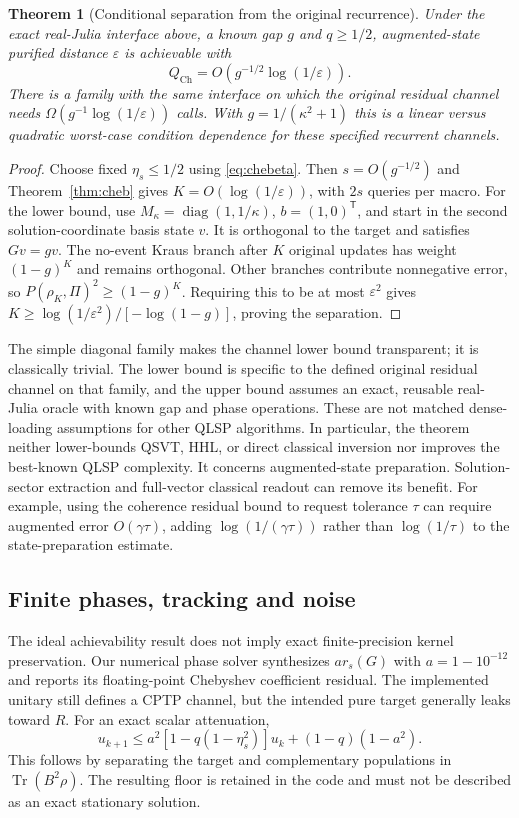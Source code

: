 \documentclass{ieeeaccess}
\newtheorem{theorem}{Theorem}\newtheorem{lemma}{Lemma}
\newcommand{\eps}{\varepsilon}\newcommand{\tr}{\mathsf T}
\newcommand{\Tr}{\operatorname{Tr}}\newcommand{\E}{\mathcal E}
\begin{document}
\begin{theorem}[Conditional separation from the original recurrence]\label{thm:separation}
Under the exact real-Julia interface above, a known gap $g$ and $q\ge1/2$, augmented-state purified distance $\eps$ is achievable with
\begin{equation}\label{eq:queryupper}
Q_{\mathrm{Ch}}=O(g^{-1/2}\log(1/\eps)).
\end{equation}
There is a family with the same interface on which the original residual channel needs $\Omega(g^{-1}\log(1/\eps))$ calls. With $g=1/(\kappa^2+1)$ this is a linear versus quadratic worst-case condition dependence for these specified recurrent channels.
\end{theorem}
\begin{proof}
Choose fixed $\eta_s\le1/2$ using \eqref{eq:chebeta}. Then $s=O(g^{-1/2})$ and Theorem~\ref{thm:cheb} gives $K=O(\log(1/\eps))$, with $2s$ queries per macro. For the lower bound, use $M_\kappa=\operatorname{diag}(1,1/\kappa)$, $b=(1,0)^{\tr}$, and start in the second solution-coordinate basis state $v$. It is orthogonal to the target and satisfies $Gv=gv$. The no-event Kraus branch after $K$ original updates has weight $(1-g)^K$ and remains orthogonal. Other branches contribute nonnegative error, so $P(\rho_K,\Pi)^2\ge(1-g)^K$. Requiring this to be at most $\eps^2$ gives $K\ge\log(1/\eps^2)/[-\log(1-g)]$, proving the separation.
\end{proof}
The simple diagonal family makes the channel lower bound transparent; it is classically trivial. The lower bound is specific to the defined original residual channel on that family, and the upper bound assumes an exact, reusable real-Julia oracle with known gap and phase operations. These are not matched dense-loading assumptions for other QLSP algorithms. In particular, the theorem neither lower-bounds QSVT, HHL, or direct classical inversion nor improves the best-known QLSP complexity. It concerns augmented-state preparation. Solution-sector extraction and full-vector classical readout can remove its benefit. For example, using the coherence residual bound to request tolerance $\tau$ can require augmented error $O(\gamma\tau)$, adding $\log(1/(\gamma\tau))$ rather than $\log(1/\tau)$ to the state-preparation estimate.

\subsection{Finite phases, tracking and noise}
The ideal achievability result does not imply exact finite-precision kernel preservation. Our numerical phase solver synthesizes $a r_s(G)$ with $a=1-10^{-12}$ and reports its floating-point Chebyshev coefficient residual. The implemented unitary still defines a CPTP channel, but the intended pure target generally leaks toward $R$. For an exact scalar attenuation,
\begin{equation}\label{eq:attenuation}
u_{k+1}\le a^2[1-q(1-\eta_s^2)]u_k+(1-q)(1-a^2).
\end{equation}
This follows by separating the target and complementary populations in $\Tr(B^2\rho)$. The resulting floor is retained in the code and must not be described as an exact stationary solution.
\end{document}
